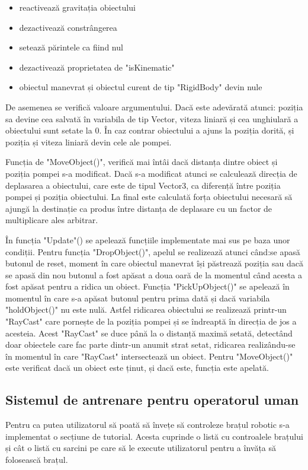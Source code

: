 \begin{itemize}
	\item reactivează gravitația obiectului
    \item dezactivează constrângerea 
    \item setează părintele ca fiind nul
    \item dezactivează proprietatea de "isKinematic"
    \item obiectul manevrat și obiectul curent de tip "RigidBody" devin nule
\end{itemize}
De asemenea se verifică valoare argumentului. Dacă este adevărată atunci: poziția sa devine cea salvată în variabila de tip Vector, viteza liniară și cea unghiulară a obiectului sunt setate la 0. În caz contrar obiectului a ajuns la poziția dorită, și poziția și viteza liniară devin  cele ale pompei. 

Funcția de "MoveObject()", verifică mai întâi dacă distanța dintre obiect și poziția pompei s-a modificat. Dacă s-a modificat atunci se calculează direcția de deplasarea a obiectului, care este de tipul Vector3, ca diferență între poziția pompei și poziția obiectului. La final este calculată forța obiectului necesară să ajungă la destinație ca produs 
între distanța de deplasare cu un factor de multiplicare ales arbitrar.

În funcția "Update"() se apelează funcțiile implementate mai sus pe baza unor condiții. Pentru  funcția "DropObject()", apelul se realizează atunci când:se apasă butonul de reset, moment în care obiectul manevrat își păstrează poziția sau dacă se apasă din nou butonul a fost apăsat a doua oară de la momentul când acesta a fost apăsat pentru a ridica un obiect. Funcția "PickUpObject()" se apelează în momentul în care s-a apăsat butonul pentru prima dată și dacă variabila "holdObject()" nu este nulă. Astfel ridicarea obiectului se realizează printr-un "RayCast" care pornește de la poziția pompei și se îndreaptă în direcția de jos a acesteia. Acest "RayCast" se duce până la o distanță maximă setată, detectând doar obiectele care fac parte dintr-un anumit strat setat, ridicarea realizându-se în momentul în care "RayCast" intersectează un obiect. Pentru "MoveObject()" este verificat dacă un obiect este ținut, și dacă este, funcția este apelată.

\subsection{Sistemul de antrenare pentru operatorul uman}
Pentru ca putea utilizatorul să poată să învețe să controleze brațul robotic s-a implementat o secțiune de tutorial. Acesta cuprinde o listă cu controalele brațului și cât o listă cu sarcini pe care să le execute utilizatorul pentru a învăța să folosească brațul.

